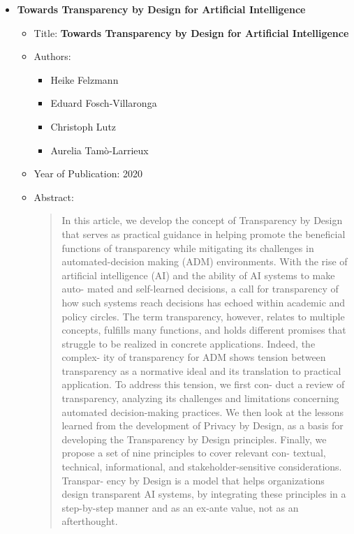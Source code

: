 \documentclass{article}
\begin{document}
\begin{itemize}
        \item \textbf{Towards Transparency by Design for Artificial Intelligence}
        \begin{itemize}
            \item Title: \textbf{Towards Transparency by Design for Artificial Intelligence}
            \item Authors:
            \begin{itemize}
                \item Heike Felzmann
                \item Eduard Fosch‑Villaronga
                \item Christoph Lutz
                \item Aurelia Tamò‑Larrieux
            \end{itemize}
            \item Year of Publication: 2020
            \item Abstract:
            \begin{abstract}
                In  this  article,  we  develop  the  concept  of  Transparency  by  Design  that  serves  as  
                practical guidance in helping promote the beneficial functions of transparency while  
                mitigating its challenges in automated-decision making (ADM) environments. With 
                the  rise  of  artificial  intelligence  (AI)  and  the  ability  of  AI  systems  to  make  auto-
                mated and self-learned decisions, a call for transparency of how such systems reach 
                decisions  has  echoed  within  academic  and  policy  circles.  The  term  transparency,  
                however,  relates  to  multiple  concepts,  fulfills  many  functions,  and  holds  different  
                promises that struggle to be realized in concrete applications. Indeed, the complex-
                ity  of  transparency  for  ADM  shows  tension  between  transparency  as  a  normative  
                ideal and its translation to practical application. To address this tension, we first con-
                duct  a  review  of  transparency,  analyzing  its  challenges  and  limitations  concerning  
                automated decision-making practices. We then look at the lessons learned from the 
                development  of  Privacy  by  Design,  as  a  basis  for  developing  the  Transparency  by  
                Design principles. Finally, we propose a set of nine principles to cover relevant con-
                textual, technical, informational, and stakeholder-sensitive considerations. Transpar-
                ency  by  Design  is  a  model  that  helps  organizations  design  transparent  AI  systems,  
                by integrating these principles in a step-by-step manner and as an ex-ante value, not 
                as an afterthought.
            \end{abstract}
        \end{itemize}
        

\end{itemize}
\end{document}
